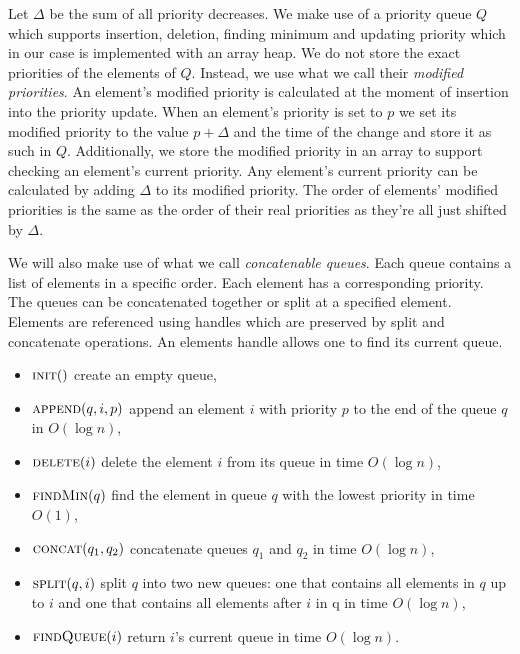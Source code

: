 Let $\Delta$ be the sum of all priority decreases. We make use of a priority queue $Q$ which supports insertion, deletion, finding minimum and updating priority which in our case is implemented with an array heap. We do not store the exact priorities of the elements of $Q$. Instead, we use what we call their \textit{modified priorities}. An element's modified priority is calculated at the moment of insertion into the priority update. When an element's priority is set to $p$ we set its modified priority to the value $p + \Delta$ and the time of the change and store it as such in $Q$. Additionally, we store the modified priority in an array to support checking an element's current priority. Any element's current priority can be calculated by adding $\Delta$ to its modified priority. The order of elements' modified priorities is the same as the order of their real priorities as they're all just shifted by $\Delta$.

We will also make use of what we call \textit{concatenable queues}. Each queue contains a list of elements in a specific order. Each element has a corresponding priority. The queues can be concatenated together or split at a specified element. Elements are referenced using handles which are preserved by split and concatenate operations. An elements handle allows one to find its current queue.

\begin{itemize}
    \item $\textsc{init}()$ create an empty queue,
    \item $\textsc{append}(q, i, p)$ append an element $i$ with priority $p$ to the end of the queue $q$ in $O(\log n)$,
    \item $\textsc{delete}(i)$ delete the element $i$ from its queue in time $O(\log n)$,
    \item $\textsc{findMin}(q)$ find the element in queue $q$ with the lowest priority in time $O(1)$,
    \item $\textsc{concat}(q_1, q_2)$ concatenate queues $q_1$ and $q_2$ in time $O(\log n)$,
    \item $\textsc{split}(q, i)$ split $q$ into two new queues: one that contains all elements in $q$ up to $i$ and one that contains all elements after $i$ in q in time $O(\log n)$,
    \item $\textsc{findQueue}(i)$ return $i$'s current queue in time $O(\log n)$.
\end{itemize}

